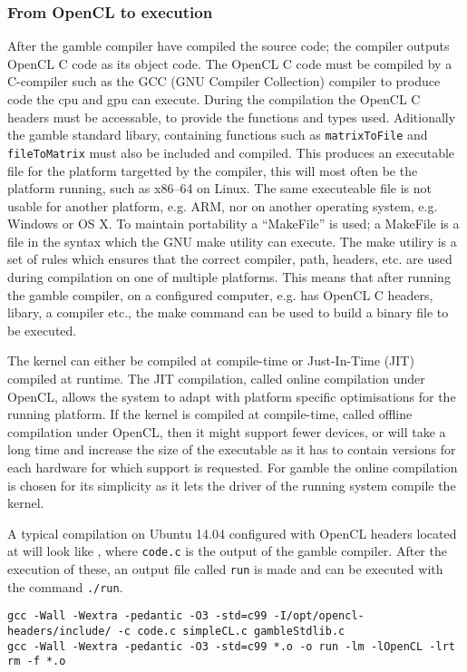 \subsubsection*{From OpenCL to execution}\label{makefile}
After the \gls{gamble} compiler have compiled the source code; the compiler outputs OpenCL C code as its object code.
The OpenCL C code must be compiled by a C-compiler such as the GCC (GNU Compiler Collection) compiler to produce code the \acrshort{cpu} and \acrshort{gpu} can execute.
During the compilation the OpenCL C headers must be accessable, to provide the functions and types used. 
Aditionally the \gls{gamble} standard libary, containing functions such as \texttt{matrixToFile} and \texttt{fileToMatrix} must also be included and compiled. 
This produces an executable file for the platform targetted by the compiler, this will most often be the platform running, such as x86--64 on Linux.
The same executeable file is not usable for another platform, e.g. ARM, nor on another operating system, e.g. Windows or OS X. 
To maintain portability a ``MakeFile'' is used; a MakeFile is a file in the syntax which the GNU make utility can execute. 
The make utiliry is a set of rules which ensures that the correct compiler, path, headers, etc. are used during compilation on one of multiple platforms. 
This means that after running the \gls{gamble} compiler, on a configured computer, e.g. has OpenCL C headers, libary, a compiler etc., the make command can be used to build a binary file to be executed.

The kernel can either be compiled at compile-time or Just-In-Time (JIT) compiled at runtime.
The JIT compilation, called online compilation under OpenCL, allows the system to adapt with platform specific optimisations for the running platform.
If the kernel is compiled at compile-time, called offline compilation under OpenCL, then it might support fewer devices, or will take a long time and increase the size of the executable as it has to contain versions for each hardware for which support is requested. \citep{openclbookjit}
For \gls{gamble} the online compilation is chosen for its simplicity as it lets the driver of the running system compile the kernel. 

A typical compilation on Ubuntu 14.04 configured with OpenCL headers located at  will look like , where \texttt{code.c} is the output of the \gls{gamble} compiler.
After the execution of these, an output file called \texttt{run} is made and can be executed with the command \texttt{./run}. 

\begin{lstlisting}[caption=The commands executed by the make command according to the rules of the MakeFile,numbers=none,frame=tlrb,label={lst:makecommands}]
gcc -Wall -Wextra -pedantic -O3 -std=c99 -I/opt/opencl-headers/include/ -c code.c simpleCL.c gambleStdlib.c
gcc -Wall -Wextra -pedantic -O3 -std=c99 *.o -o run -lm -lOpenCL -lrt
rm -f *.o
\end{lstlisting}
